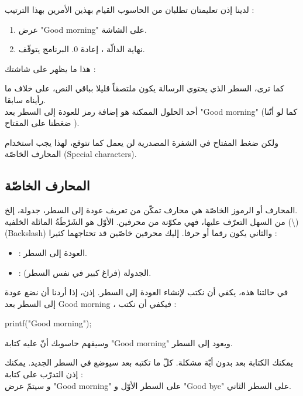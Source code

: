 لدينا إذن تعليمتان تطلبان من الحاسوب القيام بهذين الأمرين بهذا الترتيب :
\begin{enumerate}
  \item عرض
"\textenglish{Good morning}"
على الشاشة.
  \item نهاية الدالّة
، إعادة 0. البرنامج يتوقّف.
\end{enumerate}

هذا ما يظهر على شاشتك :

كما ترى، السطر الذي يحتوي الرسالة يكون ملتصقاً قليلا بباقي النص، على خلاف ما رأيناه سابقا.\\
أحد الحلول الممكنة هو إضافة رمز للعودة إلى السطر بعد
 "\textenglish{Good morning}"
 (كما لو أنّنا ضغطنا على المفتاح
).

ولكن ضغط المفتاح
 في الشفرة المصدرية لن يعمل كما تتوقع، لهذا يجب استخدام المحارف الخاصّة
(\textenglish{Special characters}).

\subsection{المحارف الخاصّة}
المحارف أو الرموز الخاصّة هي محارف تمكّن من تعريف عودة إلى السطر، جدولة، إلخ.\\
من السهل التعرّف عليها، فهي مكوّنة من محرفين. الأوّل هو الشَرْطَةُ المائلة الخلفية 
(\textbackslash) (\textenglish{Backslash})
والثاني يكون رقما أو حرفا. إليك محرفين خاصّين قد تحتاجهما كثيرا :

\begin{itemize}
  \item {} :
 العودة إلى السطر.
 \item {} :
 الجدولة (فراغ كبير في نفس السطر).
\end{itemize}

في حالتنا هذه، يكفي أن نكتب
 لإنشاء العودة إلى السطر. إذن، إذا أردنا أن نضع عودة إلى السطر بعد
\textenglish{Good morning}
، فيكفي أن نكتب :

\begin{Csource}
printf("Good morning\n");
\end{Csource}

وسيفهم حاسوبك أنّ عليه كتابة
"\textenglish{Good morning}"
 ويعود إلى السطر.

\begin{information}
  يمكنك الكتابة بعد
بدون أيّة مشكلة. كلّ ما تكتبه بعد
 سيوضع في السطر الجديد. يمكنك إذن التدرّب على كتابة :
\\
و سيتمّ عرض
"\textenglish{Good morning}"
على السطر الأوّل و
"\textenglish{Good bye}"
على السطر الثاني.
\end{information}

